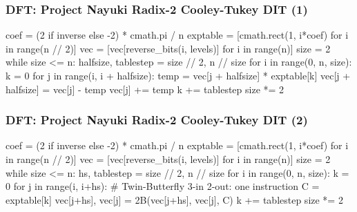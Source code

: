 \documentclass[slidestop]{beamer}
\begin{document}


\begin{frame}[fragile]
\frametitle{DFT: Project Nayuki Radix-2 Cooley-Tukey DIT (1)}

\begin{semiverbatim}
coef = (2 if inverse else -2) * cmath.pi / n
exptable = [cmath.rect(1, i*coef) for i in range(n // 2)]
vec = [vec[reverse_bits(i, levels)] for i in range(n)]
size = 2
while size <= n:
    halfsize, tablestep = size // 2, n // size
    for i in range(0, n, size):
        k = 0
        for j in range(i, i + halfsize):
            temp = vec[j + halfsize] * exptable[k]
            vec[j + halfsize] = vec[j] - temp
            vec[j] += temp
            k += tablestep
    size *= 2
\end{semiverbatim}

\end{frame}


\begin{frame}[fragile]
\frametitle{DFT: Project Nayuki Radix-2 Cooley-Tukey DIT (2)}

\begin{semiverbatim}
coef = (2 if inverse else -2) * cmath.pi / n
exptable = [cmath.rect(1, i*coef) for i in range(n // 2)]
vec = [vec[reverse_bits(i, levels)] for i in range(n)]
size = 2
while size <= n:
    hs, tablestep = size // 2, n // size
    for i in range(0, n, size):
        k = 0
        for j in range(i, i+hs):
            # Twin-Butterfly 3-in 2-out: one instruction
            C = exptable[k]
            vec[j+hs], vec[j] = 2B(vec[j+hs], vec[j], C)
            k += tablestep
    size *= 2
\end{semiverbatim}

\end{frame}
\end{document}

